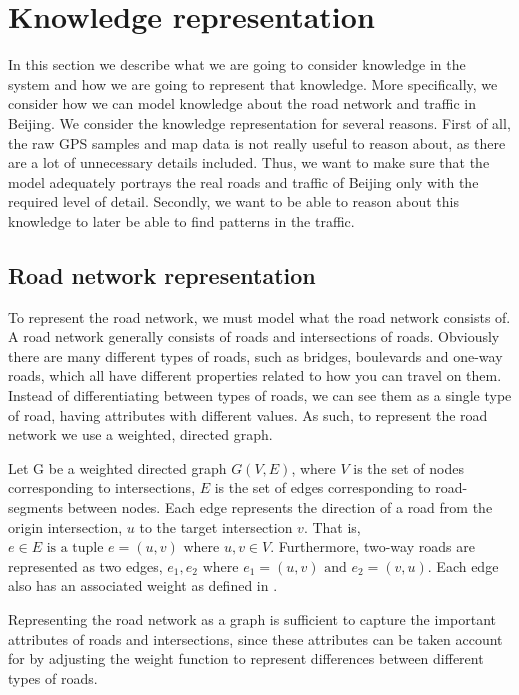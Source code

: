 \section{Knowledge representation}\label{sec:knowledge-representation}
In this section we describe what we are going to consider knowledge in the system and how we are going to represent that knowledge. More specifically, we consider how we can model knowledge about the road network and traffic in Beijing. We consider the knowledge representation for several reasons. First of all, the raw GPS samples and map data is not really useful to reason about, as there are a lot of unnecessary details included. Thus, we want to make sure that the model adequately portrays the real roads and traffic of Beijing only with the required level of detail. Secondly, we want to be able to reason about this knowledge to later be able to find patterns in the traffic.

\subsection{Road network representation}\label{sec:road-network-rep}
To represent the road network, we must model what the road network consists of. A road network generally consists of roads and intersections of roads. Obviously there are many different types of roads, such as bridges, boulevards and one-way roads, which all have different properties related to how you can travel on them. Instead of differentiating between types of roads, we can see them as a single type of road, having attributes with different values. As such, to represent the road network we use a weighted, directed graph.

Let G be a weighted directed graph $G(V,E)$, where $V$ is the set of nodes corresponding to intersections, $E$ is the set of edges corresponding to road-segments between nodes. Each edge represents the direction of a road from the origin intersection, $u$ to the target intersection $v$. That is, $e \in E \text{ is a tuple } e=(u, v) \text{ where } u, v \in V$. Furthermore, two-way roads are represented as two edges, $e_1, e_2 \text{ where } e_1 = (u, v) \text{ and } e_2=(v, u)$. Each edge also has an associated weight as defined in .

Representing the road network as a graph is sufficient to capture the important attributes of roads and intersections, since these attributes can be taken account for by adjusting the weight function to represent differences between different types of roads.

